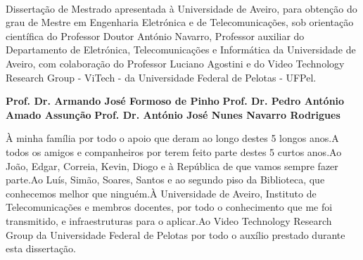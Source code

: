 \TitlePage

  \HEADER{\BAR}
         {\ThesisYear}
  \TITLE{\myName}
        {\TituloTese}
        {\ThesisTitle}
\EndTitlePage
\titlepage\ \endtitlepage %


%
%

\TitlePage
  \HEADER{}{\ThesisYear}
  \TITLE{\myName}
        {\TituloTese}
        {\ThesisTitle}
  \vskip 15mm
  \TEXT{}
       {Dissertação de Mestrado apresentada à Universidade de Aveiro, para obtenção do grau de Mestre em Engenharia Eletrónica e de Telecomunicações, sob orientação científica do Professor Doutor António Navarro, Professor auxiliar do Departamento de Eletrónica, Telecomunicações e Informática da  Universidade de Aveiro, com colaboração do Professor Luciano Agostini e do Video Technology Research Group - ViTech - da Universidade Federal de Pelotas - UFPel.}
\EndTitlePage
\titlepage\ \endtitlepage %

\TitlePage
  \vspace*{55mm}
       {}
       {\textbf{Prof. Dr. Armando José Formoso de Pinho
       }}
  \vspace*{5mm}
       {\textbf{Prof. Dr. Pedro António Amado Assunção}}
  \vspace*{5mm}
  \TEXT{}
       {\textbf{Prof. Dr. António José Nunes Navarro Rodrigues}}
\EndTitlePage
\titlepage\ \endtitlepage %

\TitlePage
  \vspace*{55mm}
       {À minha família por todo o apoio que deram ao longo destes 5 longos anos.\newline A todos os amigos e companheiros por terem feito parte destes 5 curtos anos.\newline Ao João, Edgar, Correia, Kevin, Diogo e à República de que vamos sempre fazer parte.\newline Ao Luís, Simão, Soares, Santos e ao segundo piso da Biblioteca, que conhecemos melhor que ninguém.\newline À Universidade de Aveiro, Instituto de Telecomunicações e membros docentes, por todo o conhecimento que me foi transmitido, e infraestruturas para o aplicar.\newline Ao Video Technology Research Group da Universidade Federal de Pelotas por todo o auxílio prestado durante esta dissertação.}
\EndTitlePage
\titlepage\ \endtitlepage %


